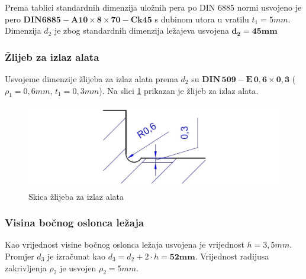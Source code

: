 \documentclass[11pt,a4paper]{article}
\begin{document}
Prema tablici standardnih dimenzija uložnih pera po DIN 6885 normi usvojeno je pero 
$\mathbf{DIN6885-A 10 \times 8 \times 70-Ck45}$ s dubinom utora u vratilu $t_1=5mm$.
Dimenzija $d_2$ je zbog standardnih dimenzija ležajeva usvojena $\mathbf{d_2=45mm}$
\subsubsection*{Žlijeb za izlaz alata}
Usvojeme dimenzije žlijeba za izlaz alata prema $d_2$ su $\mathbf{DIN \, 509-E \, 0,6 \times 0,3}$ ($\rho_1=0,6mm$, $t_1=0,3mm$). Na slici \ref{izlazAlata} prikazan je žlijeb za izlaz alata.
\begin{figure}[H]
\centering
\includegraphics[width=1\textwidth]{izlazAlata}
\caption{Skica žlijeba za izlaz alata}\label{izlazAlata}
\end{figure}
\subsubsection*{Visina bočnog oslonca ležaja}
Kao vrijednost visine bočnog oslonca ležaja usvojena je vrijednost $h=3,5mm$.
Promjer $d_3$ je izračunat kao $d_3=d_2+2 \cdot h = \mathbf{52mm}$.
Vrijednost radijusa zakrivljenja $\rho_2$ je usvojen $\rho_2=5mm$.
\end{document}
